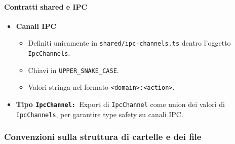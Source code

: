 \documentclass[a4paper,12pt]{article}
\begin{document}
\paragraph{Contratti shared e IPC}

\begin{itemize}
  \item \textbf{Canali IPC}
    \begin{itemize}
      \item Definiti unicamente in \texttt{shared/ipc-channels.ts} dentro l'oggetto \\ \texttt{IpcChannels}.
      \item Chiavi in \texttt{UPPER\_SNAKE\_CASE}.
      \item Valori stringa nel formato \texttt{<domain>:<action>}.
    \end{itemize}

  \item \textbf{Tipo \texttt{IpcChannel: }}Export di \texttt{IpcChannel} come union dei valori di \texttt{IpcChannels}, per garantire type safety su canali IPC. \\
\end{itemize}

\subsubsection{Convenzioni sulla struttura di cartelle e dei file}
\end{document}
